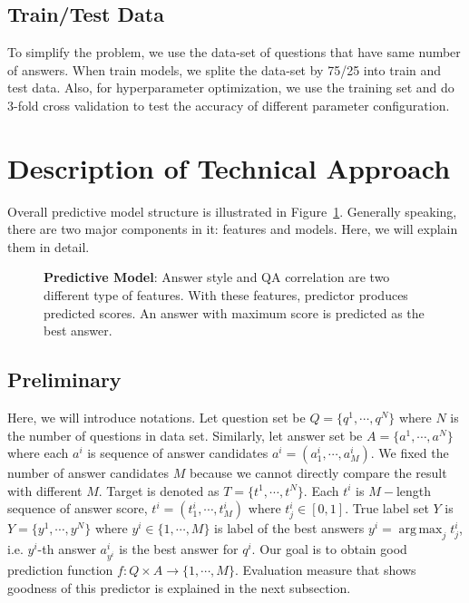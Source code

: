 \documentclass[11pt]{article}
\DeclareMathOperator*{\argmax}{arg\,max}
\begin{document}
\subsection{Train/Test Data}
To simplify the problem, we use the data-set of questions that have same number of answers. When train models, we splite the data-set by 75/25 into train and test data. Also, for hyperparameter optimization, we use the training set and do 3-fold cross validation to test the accuracy of different parameter configuration. 


\section{Description of Technical Approach}
\label{sec:tech}
Overall predictive model structure is illustrated in Figure~\ref{fig:model}. Generally speaking, there are two major components in it: features and models. Here, we will explain them in detail.
\begin{figure}[t]
    \centering
	
    \caption{{\bf Predictive Model}: Answer style and QA correlation are two different type of features. With these features, predictor produces predicted scores. An answer with maximum score is predicted as the best answer.}
    \label{fig:model}
\end{figure}

\subsection{Preliminary}
Here, we will introduce notations. Let question set be $Q = \{q^1,\cdots, q^N\}$ where $N$ is the number of questions in data set. Similarly, let answer set be $A = \{a^1,\cdots,a^N \}$ where each $a^i$ is sequence of answer candidates $a^i = (a^i_1, \cdots , a^i_M)$. We fixed the number of answer candidates $M$ because we cannot directly compare the result with different $M$. Target is denoted as $T=\{t^1, \cdots, t^N\}$. Each $t^i$ is $M-$length sequence of answer score, $t^i = (t^i_1, \cdots ,t^i_M)$ where $t^i_j \in [0,1]$. True label set $Y$ is $Y=\{y^1, \cdots, y^N\}$ where $y^i \in \{1, \cdots , M\}$ is label of the best answers $y^i = \argmax_{j} t^i_j$, i.e. $y^i$-th answer $a^i_{y^i}$ is the best answer for $q^i$. Our goal is to obtain good prediction function $f: Q \times A \rightarrow \{1,\cdots , M\}$. Evaluation measure that shows goodness of this predictor is explained in the next subsection.
\end{document}
